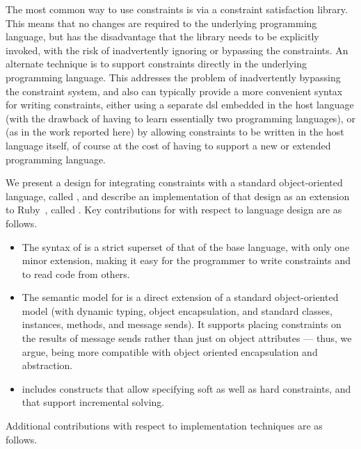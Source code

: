 The most common way to use constraints is via a constraint
satisfaction library.  This means that no changes are required to the
underlying programming language, but has the disadvantage that the
library needs to be explicitly invoked, with the risk of inadvertently
ignoring or bypassing the constraints.  An alternate technique is to
support constraints directly in the underlying programming language.
This addresses the problem of inadvertently bypassing the constraint
system, and also can typically provide a more convenient syntax for
writing constraints, either using a separate \ac{dsl} embedded in the
host language (with the drawback of having to learn essentially two
programming languages), or (as in the work reported here) by allowing
constraints to be written in the host language itself, of course at
the cost of having to support a new or extended programming language.

We present a design for integrating constraints with a standard
object-oriented language, called \langname, and describe an
implementation of that design as an extension to
Ruby~\cite{flanagan2008ruby}, called \toolname.  Key contributions for
\langname with respect to language design are as follows.

\begin{itemize}
\item The syntax of \langname is a strict superset of that of the base
  language, with only one minor extension, making it easy for the
  programmer to write constraints and to read code from others.
\item The semantic model for \langname is a direct extension of a
  standard object-oriented model (with dynamic typing, object
  encapsulation, and standard classes, instances, methods, and message
  sends).  It supports placing constraints on the results of message
  sends rather than just on object attributes --- thus, we argue,
  being more compatible with object oriented encapsulation and
  abstraction.
\item \langname includes constructs that allow specifying soft as well
  as hard constraints, and that support incremental solving.
\end{itemize}


Additional contributions with respect to implementation techniques are
as follows.

